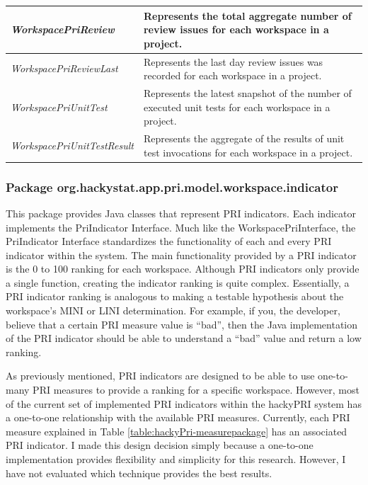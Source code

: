\begin{table}[htbp]
\begin{center}
\begin{tabular}{|p{5.5cm}|p{9.5cm}|}
\small{}\emph{WorkspacePriReview} & \small{}
Represents the total aggregate number of review issues for each workspace
in a project.  \\ \hline 

\small{}\emph{WorkspacePriReviewLast} & \small{}
Represents the last day review issues was recorded for each workspace in a
project.  \\ \hline 

\small{}\emph{WorkspacePriUnitTest} & \small{}
Represents the latest snapshot of the number of executed unit tests for
each workspace in a project. \\ \hline 

\small{}\emph{WorkspacePriUnitTestResult} & \small{}
Represents the aggregate of the results of unit test invocations for each
workspace in a project. \\ \hline 

    \end{tabular}
  \end{center}
\end{table}


\clearpage
\subsubsection{Package org.hackystat.app.pri.model.workspace.indicator}
This package provides Java classes that represent PRI indicators. Each
indicator implements the PriIndicator Interface. Much like the
WorkspacePriInterface, the PriIndicator Interface standardizes the
functionality of each and every PRI indicator within the system. The main
functionality provided by a PRI indicator is the 0 to 100 ranking for each
workspace. Although PRI indicators only provide a single function, creating
the indicator ranking is quite complex. Essentially, a PRI indicator
ranking is analogous to making a testable hypothesis about the workspace's
MINI or LINI determination. For example, if you, the developer, believe
that a certain PRI measure value is ``bad'', then the Java implementation
of the PRI indicator should be able to understand a ``bad'' value and
return a low ranking. 

As previously mentioned, PRI indicators are designed to be able to use
one-to-many PRI measures to provide a ranking for a specific workspace.
However, most of the current set of implemented PRI indicators within the
hackyPRI system has a one-to-one relationship with the available PRI
measures. Currently, each PRI measure explained in Table
\ref{table:hackyPri-measurepackage} has an associated PRI indicator. I made
this design decision simply because a one-to-one implementation provides
flexibility and simplicity for this research. However, I have not evaluated
which technique provides the best results.

